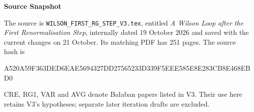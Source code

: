 \documentclass[11pt,a4paper]{article}
\newcommand{\subhead}[1]{\par\vspace{4pt}\textbf{\color{ink}#1}\par}
\begin{document}
\subhead{Source Snapshot}
The source is \texttt{WILSON\_FIRST\_RG\_STEP\_V3.tex}, entitled \emph{A Wilson Loop after the First Renormalisation Step}, internally dated 19 October 2026 and saved with the current changes on 21 October. Its matching PDF has 251 pages. The source hash is

{\footnotesize\ttfamily
    A520A59F363DED6EAE5694327DD27565233D339F5EEE585E8E283CB8E468EBD0\par}

CRE, RG1, VAR and AVG denote Ba{\l}aban papers listed in V3. Their use here retains V3's hypotheses; separate later iteration drafts are excluded.
\end{document}
